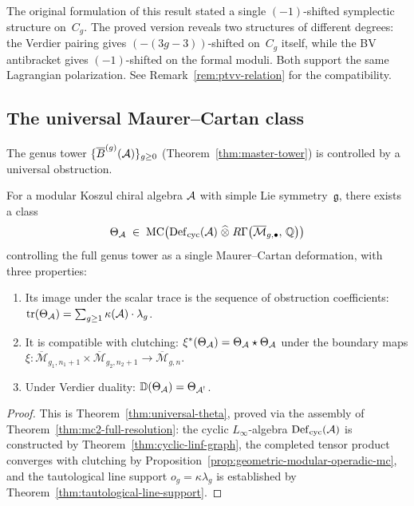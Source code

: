 \begin{remark}\label{rem:lagrangian-conj-scope}
The original formulation of this result stated a single
$(-1)$-shifted symplectic structure on~$C_g$.  The proved version
reveals two structures of different degrees: the Verdier pairing
gives $(-(3g{-}3))$-shifted on~$C_g$ itself, while the BV
antibracket gives $(-1)$-shifted on the formal moduli.  Both support
the same Lagrangian polarization.
See Remark~\ref{rem:ptvv-relation} for the compatibility.
\end{remark}

\subsection{The universal Maurer--Cartan class}

The genus tower $\{\overline{B}^{(g)}(\mathcal{A})\}_{g \geq 0}$
(Theorem~\ref{thm:master-tower}) is controlled by a universal
obstruction.

\begin{theorem}\label{thm:universal-MC}
For a modular Koszul chiral algebra $\mathcal{A}$ with simple Lie
symmetry~$\mathfrak{g}$, there exists a class
\[
\Theta_{\mathcal{A}} \;\in\;
\operatorname{MC}\!\left(
  \operatorname{Def}_{\mathrm{cyc}}(\mathcal{A})
  \;\widehat{\otimes}\;
  R\Gamma\!\left(\overline{\mathcal{M}}_{g,\bullet},\, \mathbb{Q}\right)
\right)
\]
controlling the full genus tower as a single Maurer--Cartan deformation,
with three properties:
\begin{enumerate}[label=\textup{(\roman*)}]
\item Its image under the scalar trace is the sequence of obstruction
  coefficients: $\operatorname{tr}(\Theta_{\mathcal{A}})
  = \sum_{g \geq 1} \kappa(\mathcal{A}) \cdot \lambda_g$.
\item It is compatible with clutching:
  $\xi^*(\Theta_{\mathcal{A}})
  = \Theta_{\mathcal{A}} \star \Theta_{\mathcal{A}}$
  under the boundary maps
  $\xi \colon \overline{\mathcal{M}}_{g_1,n_1+1} \times
  \overline{\mathcal{M}}_{g_2,n_2+1} \to
  \overline{\mathcal{M}}_{g,n}$.
\item Under Verdier duality:
  $\mathbb{D}(\Theta_{\mathcal{A}}) = \Theta_{\mathcal{A}^!}$.
\end{enumerate}
\end{theorem}

\begin{proof}
This is Theorem~\ref{thm:universal-theta}, proved via the
assembly of Theorem~\ref{thm:mc2-full-resolution}: the cyclic
$L_\infty$-algebra $\operatorname{Def}_{\mathrm{cyc}}(\mathcal{A})$ is constructed by
Theorem~\ref{thm:cyclic-linf-graph}, the completed tensor product
converges with clutching by
Proposition~\ref{prop:geometric-modular-operadic-mc}, and the
tautological line support $o_g = \kappa \lambda_g$ is established
by Theorem~\ref{thm:tautological-line-support}.
\end{proof}

